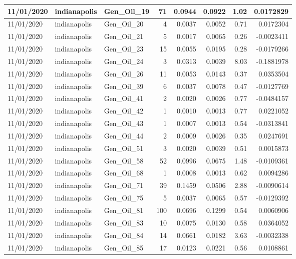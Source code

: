 \documentclass[
  letterpaper,
  DIV=11,
  numbers=noendperiod]{scrartcl}
\begin{document}
\begin{tabular}{l|l|l|r|r|r|r|r}
\hline
11/01/2020 & indianapolis & Gen\_Oil\_19 & 71 & 0.0944 & 0.0922 & 1.02 & 0.0172829\\
\hline
11/01/2020 & indianapolis & Gen\_Oil\_20 & 4 & 0.0037 & 0.0052 & 0.71 & 0.0172304\\
\hline
11/01/2020 & indianapolis & Gen\_Oil\_21 & 5 & 0.0017 & 0.0065 & 0.26 & -0.0023411\\
\hline
11/01/2020 & indianapolis & Gen\_Oil\_23 & 15 & 0.0055 & 0.0195 & 0.28 & -0.0179266\\
\hline
11/01/2020 & indianapolis & Gen\_Oil\_24 & 3 & 0.0313 & 0.0039 & 8.03 & -0.1881978\\
\hline
11/01/2020 & indianapolis & Gen\_Oil\_26 & 11 & 0.0053 & 0.0143 & 0.37 & 0.0353504\\
\hline
11/01/2020 & indianapolis & Gen\_Oil\_39 & 6 & 0.0037 & 0.0078 & 0.47 & -0.0127769\\
\hline
11/01/2020 & indianapolis & Gen\_Oil\_41 & 2 & 0.0020 & 0.0026 & 0.77 & -0.0484157\\
\hline
11/01/2020 & indianapolis & Gen\_Oil\_42 & 1 & 0.0010 & 0.0013 & 0.77 & 0.0221052\\
\hline
11/01/2020 & indianapolis & Gen\_Oil\_43 & 1 & 0.0007 & 0.0013 & 0.54 & -0.0313841\\
\hline
11/01/2020 & indianapolis & Gen\_Oil\_44 & 2 & 0.0009 & 0.0026 & 0.35 & 0.0247691\\
\hline
11/01/2020 & indianapolis & Gen\_Oil\_51 & 3 & 0.0020 & 0.0039 & 0.51 & 0.0015873\\
\hline
11/01/2020 & indianapolis & Gen\_Oil\_58 & 52 & 0.0996 & 0.0675 & 1.48 & -0.0109361\\
\hline
11/01/2020 & indianapolis & Gen\_Oil\_68 & 1 & 0.0008 & 0.0013 & 0.62 & 0.0094286\\
\hline
11/01/2020 & indianapolis & Gen\_Oil\_71 & 39 & 0.1459 & 0.0506 & 2.88 & -0.0090614\\
\hline
11/01/2020 & indianapolis & Gen\_Oil\_75 & 5 & 0.0037 & 0.0065 & 0.57 & -0.0129392\\
\hline
11/01/2020 & indianapolis & Gen\_Oil\_81 & 100 & 0.0696 & 0.1299 & 0.54 & 0.0060906\\
\hline
11/01/2020 & indianapolis & Gen\_Oil\_83 & 10 & 0.0075 & 0.0130 & 0.58 & 0.0364052\\
\hline
11/01/2020 & indianapolis & Gen\_Oil\_84 & 14 & 0.0661 & 0.0182 & 3.63 & -0.0032338\\
\hline
11/01/2020 & indianapolis & Gen\_Oil\_85 & 17 & 0.0123 & 0.0221 & 0.56 & 0.0108861\\

\end{tabular}
\end{document}
